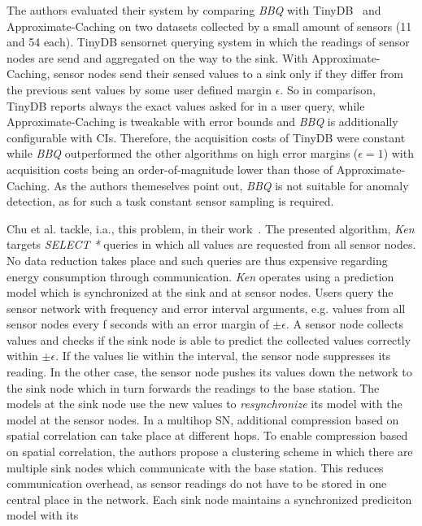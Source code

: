 The authors evaluated their system by comparing \textit{BBQ} with
TinyDB~\cite{madden2005tinydb} and Approximate-Caching on two datasets
collected by a small amount of sensors (11 and 54 each). TinyDB sensornet
querying system in which the readings of sensor nodes are send and aggregated
on the way to the sink. With Approximate-Caching, sensor nodes send their
sensed values to a sink only if they differ from the previous sent values by
some user defined margin $ \epsilon $. So in comparison, TinyDB reports always
the exact values asked for in a user query, while  Approximate-Caching is
tweakable with error bounds and \textit{BBQ} is additionally configurable with
\acp{CI}. Therefore, the acquisition costs of TinyDB were constant while
\textit{BBQ} outperformed the other algorithms on high error margins ($
\epsilon = 1 $) with acquisition costs being an order-of-magnitude lower than
those of Approximate-Caching. As the authors themeselves point out,
\textit{BBQ} is not suitable for anomaly detection, as for such a task constant
sensor sampling is required.
\par
Chu et al. tackle, i.a., this problem, in their work~\cite{chu2006approximate}.
The presented algorithm, \textit{Ken} targets \textit{SELECT *} queries in
which all values are requested from all sensor nodes. No data reduction takes
place and such queries are thus expensive regarding energy consumption through
communication. \textit{Ken} operates using a prediction model which is
synchronized at the sink and at sensor nodes. Users query the sensor network
with frequency and error interval arguments, e.g. values from all sensor nodes
every f seconds with an error margin of $ \pm\epsilon $. A sensor node collects
values and checks if the sink node is able to predict the collected values
correctly within $ \pm\epsilon $. If the values lie within the interval, the
sensor node suppresses its reading. In the other case, the sensor node pushes
its values down the network to the sink node which in turn forwards the
readings to the base station. The models at the sink node use the new values to
\textit{resynchronize} its model with the model at the sensor nodes. In a
multihop \ac{SN}, additional compression based on spatial correlation can take
place at different hops. To enable compression based on spatial correlation,
the authors propose a clustering scheme in which there are multiple sink nodes
which communicate with the base station. This reduces communication overhead,
as sensor readings do not have to be stored in one central place in the
network. Each sink node maintains a synchronized prediciton model with its
